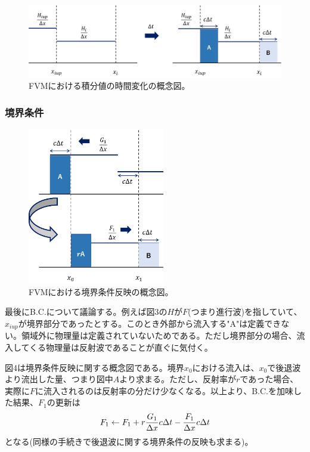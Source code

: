 \documentclass[dvipdfmx, 9pt, a4paper]{jsarticle}
\begin{document}
\begin{figure}[t]
\begin{center}
\includegraphics[width=12cm]{"fig3.png"}
\caption{FVMにおける積分値の時間変化の概念図。}
\end{center}
\end{figure}

\subsubsection{境界条件}

\begin{figure}[t]
\begin{center}
\includegraphics[width=6cm]{"fig4.png"}
\caption{FVMにおける境界条件反映の概念図。}
\end{center}
\end{figure}

最後にB.C.について議論する。例えば図3の$H$が$F$(つまり進行波)を指していて、$x_{iup}$が境界部分であったとする。このとき外部から流入する"A"は定義できない。領域外に物理量は定義されていないためである。ただし境界部分の場合、流入してくる物理量は反射波であることが直ぐに気付く。\par
図4は境界条件反映に関する概念図である。境界$x_0$における流入は、$x_0$で後退波より流出した量、つまり図中$A$より求まる。ただし、反射率が$r$であった場合、実際に$F$に流入されるのは反射率の分だけ少なくなる。以上より、B.C.を加味した結果、$F_1$の更新は
\begin{equation}
F_1 \leftarrow F_1 + r\frac{G_1}{\Delta x}c\Delta t - \frac{F_1}{\Delta x}c\Delta t \notag
\end{equation}
となる(同様の手続きで後退波に関する境界条件の反映も求まる)。
\end{document}
